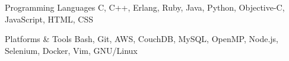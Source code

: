 

\begin{cvskills}

  \cvskill
    {Programming Languages} %
    {C, C++, Erlang, Ruby, Java, Python, Objective-C, JavaScript, HTML, CSS} %

  \cvskill
  {Platforms \& Tools} %
    {Bash, Git, AWS, CouchDB, MySQL, OpenMP, Node.js, Selenium, Docker, Vim, GNU/Linux} %

\end{cvskills}
